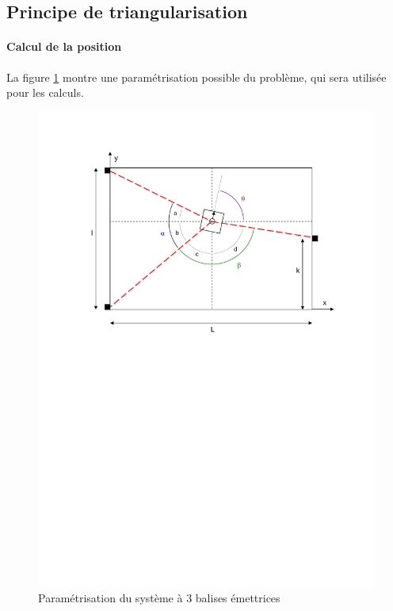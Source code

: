 \documentclass[a4paper]{article}
\begin{document}
\subsection{Principe de triangularisation}

\paragraph{Calcul de la position}

La figure \ref{Systeme_3_balises_emettrices_parametrisation} montre une paramétrisation possible du problème, qui sera utilisée pour les calculs.

\begin{figure}[H]
	\centering
	\includegraphics[scale=1.00]{Images/Systeme_3_balises_emettrices_parametrisation}
	\caption{Paramétrisation du système à 3 balises émettrices
		\label{Systeme_3_balises_emettrices_parametrisation}}
\end{figure}
\end{document}

